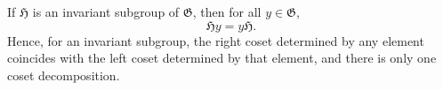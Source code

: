 If $\mathfrak{H}$ is an invariant subgroup of $\mathfrak{G}$, then for all $y \in \mathfrak{G}$,
\[
\mathfrak{H}y = y\mathfrak{H}.
\]
Hence, for an invariant subgroup, the right coset determined by any element coincides with the left coset determined by that element, and there is only one coset decomposition.
